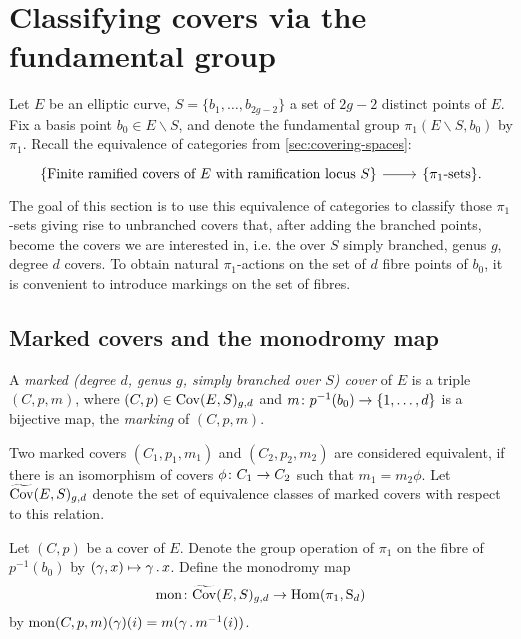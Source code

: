 \section{Classifying covers via the fundamental group}

Let $E$ be an elliptic curve, $S=\{b_1,\dotsc,b_{2g-2}\}$ a set of $2g-2$ distinct points of $E$. Fix a basis point $b_0\in E\smallsetminus S$, and denote the fundamental group $\pi_1(E\smallsetminus S, b_0)$ by $\pi_1$.
Recall the equivalence of categories from \ref{sec:covering-spaces}:
\[
 \begin{tikzcd}
  \{\text{Finite ramified covers of }E\text{ with ramification locus $S$}\} \arrow{r} & \{\pi_1\text{-sets}\}.
 \end{tikzcd}
\]
The goal of this section is to use this equivalence of categories to classify those $\pi_1$-sets giving rise to unbranched covers that, after adding the branched points, become the covers we are interested in, i.e. the over $S$ simply branched, genus $g$, degree $d$ covers. To obtain natural $\pi_1$-actions on the set of $d$ fibre points of $b_0$, it is convenient to introduce markings on the set of fibres.

\subsection{Marked covers and the monodromy map}

\begin{defi}
 A \emph{marked (degree $d$, genus $g$, simply branched over $S$) cover} of $E$ is a triple $(C,p,m)$, where $(C,p)\in \operatorname{Cov}(E,S)_{g,d}$ and $m\colon p^{-1}(b_0)\to \{1,\dotsc,d\}$ is a bijective map, the \emph{marking} of $(C,p,m)$.
 
 Two marked covers $(C_1,p_1,m_1)$ and $(C_2,p_2,m_2)$ are considered equivalent, if there is an isomorphism of covers $\phi\colon C_1 \to C_2$ such that $m_1=m_2\phi$. Let $\widetilde{\operatorname{Cov}}(E,S)_{g,d}$ denote the set of equivalence classes of marked covers with respect to this relation.
\end{defi}

\begin{defi}
 Let $(C,p)$ be a cover of $E$. Denote the group operation of $\pi_1$ on the fibre of $p^{-1}(b_0)$ by $(\gamma,x)\mapsto \gamma\,.\, x$. Define the monodromy map \[\operatorname{mon}\colon \widetilde{\operatorname{Cov}}(E,S)_{g,d} \to \operatorname{Hom}(\pi_1, \operatorname{S}_d)\]
 by $\operatorname{mon}(C,p,m)(\gamma)(i)=m(\gamma\,.\, m^{-1}(i))$.
\end{defi}

